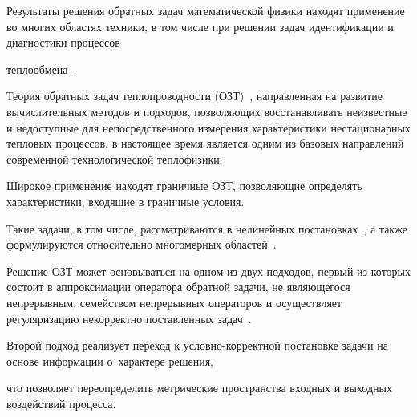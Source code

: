 
\renewcommand{\JournalDataOnline}{\displaydate{rapoporte}}






\makerutitle







Результаты решения обратных задач математической физики находят применение во многих областях техники, в том числе при решении задач идентификации и диагностики процессов 

теплообмена~\cite{ulg:bib:Ozisik, ulg:bib:Alifanov_Opening_Lecture, ulg:bib:Matsevityi_Param_funct_identif}. 

Теория обратных задач теплопроводности (ОЗТ)~\cite{ulg:bib:Ozisik, ulg:bib:Alifanov_Opening_Lecture, ulg:bib:Matsevityi_Param_funct_identif, ulg:bib:Alifanov_OZT, ulg:bib:Beck_Blackwel, ulg:bib:Vatulyan_IP_MDTT}, направленная на развитие вычислительных методов и подходов, позволяющих восстанавливать неизвестные и  недоступные для непосредственного измерения характеристики нестационарных тепловых процессов, в настоящее время является одним из базовых направлений современной технологической теплофизики.

Широкое применение находят граничные ОЗТ, позволяющие определять характеристики, входящие в граничные условия. 

Такие задачи, в том числе, рассматриваются в нелинейных постановках~\cite{ulg:bib:Alifanov_Russian_contribution, ulg:bib:Matsevityi_nonlinear_IHCP}, а также формулируются относительно многомерных областей~\cite{ulg:bib:Zhi_Qian_Numerical_solution, ulg:bib:Ching_yu_boundary_estimation, ulg:bib:Kuzin_2_D}.







Решение ОЗТ может основываться на одном из двух подходов, первый из которых состоит в аппроксимации оператора обратной задачи, не являющегося непрерывным, семейством непрерывных операторов и осуществляет регуляризацию некорректно поставленных задач~\cite{ulg:bib:Tikhonov_Arsenin}.

Второй подход реализует переход к условно-корректной постановке задачи на основе информации о~характере решения, 

что позволяет переопределить метрические пространства входных и выходных воздействий процесса. 

